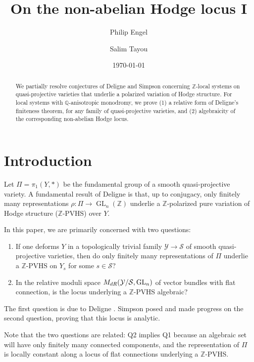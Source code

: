 \documentclass[10pt,letterpaper,english,reqno]{amsart}
\title[Non-abelian Hodge locus]{On the non-abelian Hodge locus I}%
\author{Philip Engel}
\author{Salim Tayou}
\date{\today}
\numberwithin{equation}{subsection}
\newcommand\cS{{\mathcal S}}
\newcommand\cY{{\mathcal Y}}
\newcommand\Q{{\mathbb Q}}
\newcommand\Z{{\mathbb Z}}
\DeclareMathOperator{\GL}{GL}
\theoremstyle{definition}
\begin{document}
\begin{abstract}

We partially resolve conjectures of Deligne and Simpson 
concerning $\Z$-local systems on quasi-projective varieties
that underlie a polarized variation of Hodge structure.
For local systems with $\Q$-anisotropic monodromy, we prove
(1) a relative form of Deligne's finiteness theorem, for any 
family of quasi-projective varieties, and (2) algebraicity 
of the corresponding non-abelian Hodge locus.
\end{abstract}

\maketitle
\setcounter{tocdepth}{1}
\tableofcontents

\section{Introduction}

Let $\Pi=\pi_1(Y,*)$ be the fundamental group of a smooth
quasi-projective variety. A fundamental result of Deligne \cite{deligne87} is that, up to conjugacy, only finitely many representations 
$\rho\colon \Pi\to \GL_n(\Z)$ underlie a $\Z$-polarized pure variation of Hodge structure ($\Z$-PVHS) over $Y$.

In this paper, we are primarily concerned with two questions:
\begin{enumerate}
\item[(Q1)] If one deforms $Y$ in a topologically trivial family $\cY\to \cS$ of smooth quasi-projective varieties, then do only finitely many representations of $\Pi$ underlie a $\Z$-PVHS on $Y_s$ for some $s \in \cS$? \vspace{2pt}
\item[(Q2)] In the relative moduli space $M_{\rm dR}(\cY/\cS,\GL_n)$ of vector bundles with flat connection, is the locus underlying a $\Z$-PVHS algebraic?
\end{enumerate}

The first question is due to Deligne \cite[Question 3.13]{deligne87}. Simpson \cite[Conjecture 12.3]{simpson} posed
and made progress on the second question, proving that this locus is analytic.

Note that the two questions are related: Q2 implies
Q1 because an algebraic set will have only finitely many 
connected components, and the representation of $\Pi$ is 
locally constant along a locus of flat connections underlying a $\Z$-PVHS.
\end{document}
